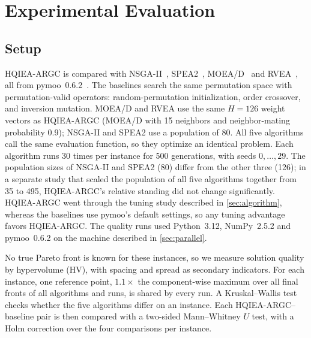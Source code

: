 \section{Experimental Evaluation}
\label{sec:experiments}

\subsection{Setup}
HQIEA-ARGC is compared with NSGA-II~\cite{deb2002nsga2}, SPEA2~\cite{zitzler2001spea2},
MOEA/D~\cite{zhang2007moead} and RVEA~\cite{cheng2016rvea}, all from
pymoo~0.6.2~\cite{blank2020pymoo}. The baselines search the same permutation space
with permutation-valid operators: random-permutation initialization, order
crossover, and inversion mutation. MOEA/D and RVEA use the same $H=126$ weight
vectors as HQIEA-ARGC (MOEA/D with 15 neighbors and neighbor-mating probability
0.9); NSGA-II and SPEA2 use a population of 80. All five algorithms call the same
evaluation function, so they optimize an identical problem. Each algorithm runs
30 times per instance for 500 generations, with seeds $0,\dots,29$. The
population sizes of NSGA-II and SPEA2 (80) differ from the other three (126); in a
separate study that scaled the population of all five algorithms together from
35 to 495, HQIEA-ARGC's relative standing did not change significantly. HQIEA-ARGC
went through the tuning study described in \cref{sec:algorithm}, whereas the
baselines use pymoo's default settings, so any tuning advantage favors
HQIEA-ARGC. The quality runs used Python~3.12, NumPy~2.5.2 and pymoo~0.6.2 on the
machine described in \cref{sec:parallel}.

No true Pareto front is known for these instances, so we measure solution quality
by hypervolume (HV), with spacing and spread as secondary indicators. For each
instance, one reference point, $1.1\times$ the component-wise maximum over all
final fronts of all algorithms and runs, is shared by every run. A Kruskal--Wallis
test checks whether the five algorithms differ on an instance. Each
HQIEA-ARGC--baseline pair is then compared with a two-sided Mann--Whitney $U$ test,
with a Holm correction over the four comparisons per instance.

